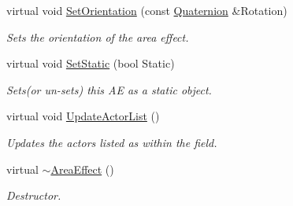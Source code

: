 \begin{DoxyCompactItemize}
virtual void \hyperlink{classphys_1_1AreaEffect_a426c3cb70e8de1fc90d4acdf2e425cd6}{SetOrientation} (const \hyperlink{classphys_1_1Quaternion}{Quaternion} \&Rotation)
\begin{DoxyCompactList}\small\item\em Sets the orientation of the area effect. \item\end{DoxyCompactList}\item 
virtual void \hyperlink{classphys_1_1AreaEffect_acc55b82b29952902c3e9a3810decf3d9}{SetStatic} (bool Static)
\begin{DoxyCompactList}\small\item\em Sets(or un-\/sets) this AE as a static object. \item\end{DoxyCompactList}\item 
virtual void \hyperlink{classphys_1_1AreaEffect_a0a0e6dfc6353d19b19e7bea037172072}{UpdateActorList} ()
\begin{DoxyCompactList}\small\item\em Updates the actors listed as within the field. \item\end{DoxyCompactList}\item 
virtual \hyperlink{classphys_1_1AreaEffect_aa9e6d721d337c32aa47357060d319924}{$\sim$AreaEffect} ()
\begin{DoxyCompactList}\small\item\em Destructor. \item\end{DoxyCompactList}\end{DoxyCompactItemize}
